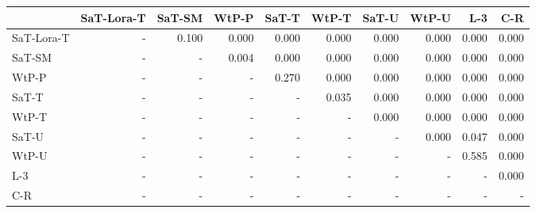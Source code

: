 \begin{tabular}{lrrrrrrrrr}
\toprule
 & SaT-Lora-T & SaT-SM & WtP-P & SaT-T & WtP-T & SaT-U & WtP-U & L-3 & C-R \\
\midrule
SaT-Lora-T & - & 0.100 & 0.000 & 0.000 & 0.000 & 0.000 & 0.000 & 0.000 & 0.000 \\
SaT-SM & - & - & 0.004 & 0.000 & 0.000 & 0.000 & 0.000 & 0.000 & 0.000 \\
WtP-P & - & - & - & 0.270 & 0.000 & 0.000 & 0.000 & 0.000 & 0.000 \\
SaT-T & - & - & - & - & 0.035 & 0.000 & 0.000 & 0.000 & 0.000 \\
WtP-T & - & - & - & - & - & 0.000 & 0.000 & 0.000 & 0.000 \\
SaT-U & - & - & - & - & - & - & 0.000 & 0.047 & 0.000 \\
WtP-U & - & - & - & - & - & - & - & 0.585 & 0.000 \\
L-3 & - & - & - & - & - & - & - & - & 0.000 \\
C-R & - & - & - & - & - & - & - & - & - \\
\bottomrule
\end{tabular}

